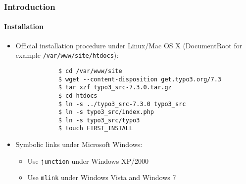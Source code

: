 \begin{frame}[fragile]
	\frametitle{Introduction}
	\framesubtitle{Installation}

	\begin{itemize}
		\item Official installation procedure under Linux/Mac OS X\newline
			(DocumentRoot for example \texttt{/var/www/site/htdocs}):
		\begin{lstlisting}
			$ cd /var/www/site
			$ wget --content-disposition get.typo3.org/7.3
			$ tar xzf typo3_src-7.3.0.tar.gz
			$ cd htdocs
			$ ln -s ../typo3_src-7.3.0 typo3_src
			$ ln -s typo3_src/index.php
			$ ln -s typo3_src/typo3
			$ touch FIRST_INSTALL
		\end{lstlisting}

		\item Symbolic links under Microsoft Windows:

			\begin{itemize}
				\item Use \texttt{junction} under Windows XP/2000
				\item Use \texttt{mlink} under Windows Vista and Windows 7
			\end{itemize}

	\end{itemize}
\end{frame}

